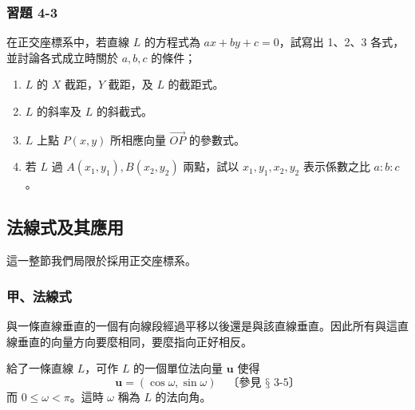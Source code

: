 \subsubsection*{習題 4-3}

在正交座標系中，若直線 $L$ 的方程式為 $ax + by + c = 0$，試寫出 1、2、3 各式，並討論各式成立時關於 $a, b, c$ 的條件；
\begin{enumerate}[label=\arabic*., leftmargin=2em]
  \item $L$ 的 $X$ 截距，$Y$ 截距，及 $L$ 的截距式。
  \item $L$ 的斜率及 $L$ 的斜截式。
  \item $L$ 上點 $P(x, y)$ 所相應向量 $\vec{OP}$ 的參數式。
  \item 若 $L$ 過 $A(x_1, y_1), B(x_2, y_2)$ 兩點，試以 $x_1, y_1, x_2, y_2$ 表示係數之比 $a : b : c$。
\end{enumerate}

\subsection{法線式及其應用}
\label{sec:4-4}

這一整節我們局限於採用正交座標系。

\subsubsection*{甲、法線式}

與一條直線垂直的一個有向線段經過平移以後還是與該直線垂直。因此所有與這直線垂直的向量方向要麼相同，要麼指向正好相反。

給了一條直線 $L$，可作 $L$ 的一個單位法向量 $\mathbf{u}$ 使得
\[ \mathbf{u} = (\cos\omega, \sin\omega) \quad\text{〔參見 § 3-5〕} \]
而 $0 \le \omega < \pi$。這時 $\omega$ 稱為 $L$ 的法向角。

